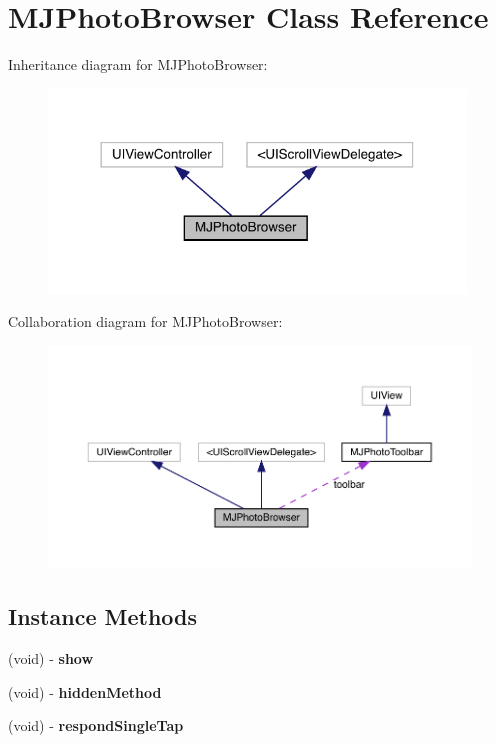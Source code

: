 \hypertarget{interface_m_j_photo_browser}{}\section{M\+J\+Photo\+Browser Class Reference}
\label{interface_m_j_photo_browser}


Inheritance diagram for M\+J\+Photo\+Browser\+:\nopagebreak
\begin{figure}[H]
\begin{center}
\leavevmode
\includegraphics[width=314pt]{interface_m_j_photo_browser__inherit__graph}
\end{center}
\end{figure}


Collaboration diagram for M\+J\+Photo\+Browser\+:\nopagebreak
\begin{figure}[H]
\begin{center}
\leavevmode
\includegraphics[width=350pt]{interface_m_j_photo_browser__coll__graph}
\end{center}
\end{figure}
\subsection*{Instance Methods}
\begin{DoxyCompactItemize}
\item 
\mbox{\label{interface_m_j_photo_browser_aa173bd72742281350b575f318f9a8679}} 
(void) -\/ {\bfseries show}
\item 
\mbox{\label{interface_m_j_photo_browser_ab1ba7c9cc613193624b412500cf4d485}} 
(void) -\/ {\bfseries hidden\+Method}
\item 
\mbox{\label{interface_m_j_photo_browser_a39bf06d7ba8527f95f94245638cce97c}} 
(void) -\/ {\bfseries respond\+Single\+Tap}
\end{DoxyCompactItemize}
